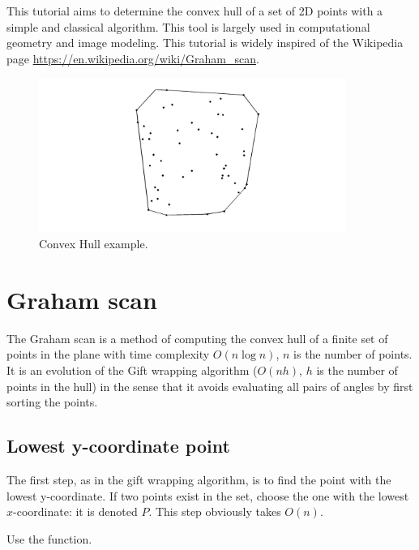 \def\difficulty{2}

\begin{note}This tutorial aims to determine the convex hull of a set of 2D points with a simple and classical algorithm. This tool is largely used in computational geometry and image modeling. This tutorial is widely inspired of the Wikipedia page \url{https://en.wikipedia.org/wiki/Graham_scan}.\end{note}

\begin{figure}[htbp]\centering\caption{Convex Hull example.}\includegraphics[width=10cm]{convhull.png}%
\end{figure}

\section{Graham scan}
The Graham scan is a method of computing the convex hull of a finite set of points in the plane with time complexity $O(n \log n)$, $n$ is the number of points. It is an evolution of the Gift wrapping algorithm ($O(nh)$, $h$ is the number of points in the hull) in the sense that it avoids evaluating all pairs of angles by first sorting the points.


\subsection{Lowest y-coordinate point}
The first step, as in the gift wrapping algorithm, is to find the point with the lowest y-coordinate. If two points exist in the set, choose the one with the lowest $x$-coordinate: it is denoted $P$. This step obviously takes $O(n)$.

\begin{mcomment}
\begin{mremark}
Use the  function.
\end{mremark}
\end{mcomment}


